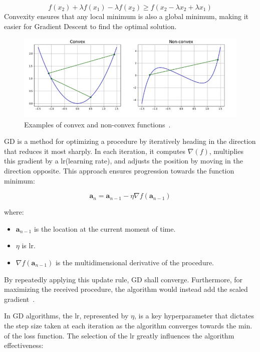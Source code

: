 \documentclass[12pt,a4paper]{report}
\begin{document}
\begin{itemize}
\begin{equation}
          f(x_2) + \lambda f(x_1) - \lambda f(x_2) \geq f(x_2 - \lambda x_2 + \lambda x_1)
        \end{equation}
        Convexity ensures that any local minimum is also a global minimum, making it easier for Gradient Descent to find the optimal solution.
        \begin{figure}[th]
          \centering
          \includegraphics[scale=0.637]{./pics/conv_unconv_func.png}
          \caption[Examples of non-differentiable functions]{Examples of convex and non-convex functions~\cite{gradientdescent}.}
          \label{fig:pic3}
        \end{figure}
\end{itemize}


GD is a method for optimizing a procedure by iteratively heading in the direction that reduces it most sharply. In each iteration, it computes $\nabla(f)$, multiplies this gradient by a lr(learning rate), and adjusts the position by moving in the direction opposite. This approach ensures progression towards the function minimum:

\begin{equation}
  \mathbf{a}_{n} = \mathbf{a}_{n-1} - \eta \nabla f(\mathbf{a}_{n-1})
\end{equation}

where:
\begin{itemize}
  \item $\mathbf{a}_{n-1}$ is the location at the current moment of time.
  \item $\eta$ is lr.
  \item $\nabla f(\mathbf{a}_{n-1})$ is the multidimensional derivative of the procedure.
\end{itemize}

By repeatedly applying this update rule, GD shall converge. Furthermore, for maximizing the received procedure, the algorithm would instead add the scaled gradient~\cite{gradientdescent}.

In GD algorithms, the lr, represented by \(\eta\), is a key hyperparameter that dictates the step size taken at each iteration as the algorithm converges towards the min. of the loss function. The selection of the lr greatly influences the algorithm effectiveness:
\end{document}
